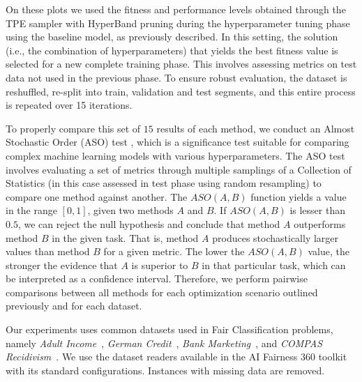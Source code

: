 On these plots we used the fitness and performance levels obtained through the TPE sampler with HyperBand pruning during the hyperparameter tuning phase using the baseline model, as previously described. In this setting, the solution (i.e., the combination of hyperparameters) that yields the best fitness value is selected for a new complete training phase. This involves assessing metrics on test data not used in the previous phase. To ensure robust evaluation, the dataset is reshuffled, re-split into train, validation and test segments, and this entire process is repeated over 15 iterations.

To properly compare this set of $15$ results of each method, we conduct an Almost Stochastic Order (ASO) test \citep{dror2019deep}, which is a significance test suitable for comparing complex machine learning models with various hyperparameters. The ASO test involves evaluating a set of metrics through multiple samplings of a Collection of Statistics (in this case assessed in test phase using random resampling) to compare one method against another. The $ASO(A, B)$ function yields a value in the range $[0, 1]$, given two methods $A$ and $B$. If $ASO(A, B)$ is lesser than $0.5$, we can reject the null hypothesis and conclude that method $A$ outperforms method $B$ in the given task. That is, method $A$ produces stochastically larger values than method $B$ for a given metric. The lower the $ASO(A, B)$ value, the stronger the evidence that $A$ is superior to $B$ in that particular task, which can be interpreted as a confidence interval. Therefore, we perform pairwise comparisons between all methods for each optimization scenario outlined previously and for each dataset.


Our experiments uses common datasets used in Fair Classification problems, namely \textit{Adult Income}~\citep{misc_adult_2}, \textit{German Credit}~\citep{misc_statlog_(german_credit_data)_144}, \textit{Bank Marketing}~\citep{misc_bank_marketing_222}, and \textit{COMPAS Recidivism}~\citep{misc_compas}. We use the dataset readers available in the AI Fairness 360 toolkit~\citep{aif360-oct-2018} with its standard configurations. Instances with missing data are removed.

